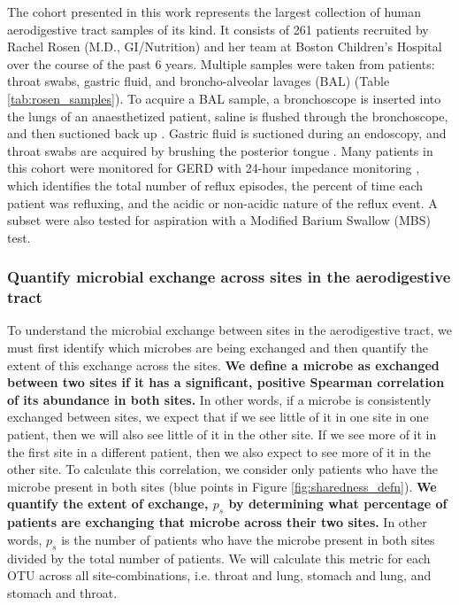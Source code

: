 \documentclass[12pt]{article}
\begin{document}
The cohort presented in this work represents the largest collection of 
human aerodigestive tract samples of its kind.
It consists of 261 patients recruited by Rachel Rosen 
(M.D., GI/Nutrition) and her team at Boston Children's Hospital  
over the course of the past 6 years. Multiple samples were 
taken from patients: throat swabs, gastric fluid, and broncho-alveolar lavages (BAL) (Table \ref{tab:rosen_samples}). 
To acquire a BAL sample, a bronchoscope is inserted into the lungs 
of an anaesthetized patient, saline is flushed through the 
bronchoscope, and then suctioned back up \cite{charslon-topographical-2011}. 
Gastric fluid is suctioned during an endoscopy, and throat
swabs are acquired by brushing the posterior tongue \cite{rosen-ppi-2015}. 
Many patients in this cohort were monitored for GERD with 24-hour
impedance monitoring \cite{vakil-gerd_defn-2006}, which identifies the total number of reflux episodes,
the percent of time each patient was refluxing, and the acidic or non-acidic
nature of the reflux event. A subset were also tested for aspiration with
a Modified Barium Swallow (MBS) test.

\subsubsection{Quantify microbial exchange across sites in the aerodigestive tract} \label{sec:exchange}

To understand the microbial exchange between sites in the 
aerodigestive tract, we must first identify which microbes are being exchanged
and then quantify the extent of this exchange across the sites. 
\textbf{We define a microbe as exchanged between two sites if it has a significant, positive Spearman 
correlation of its abundance in both sites.}
In other words, if a microbe is consistently exchanged between sites, 
we expect that if we see little of it in one site in one patient, then we will also see little of it in the other site. 
If we see more of it in the first site in a different patient,
then we also expect to see more of it in the other site.
To calculate this correlation, we consider only patients who have the microbe present in both sites (blue points in Figure \ref{fig:sharedness_defn}).
\textbf{We quantify the extent of exchange, $p_s$ by determining what percentage of
patients are exchanging that microbe across their two sites.}
In other words, $p_s$  is the number of patients who have the microbe present in both 
sites divided by the total number of patients.
We will calculate this metric for each OTU across all site-combinations, 
i.e. throat and lung, stomach and lung, and stomach and throat.
\end{document}
